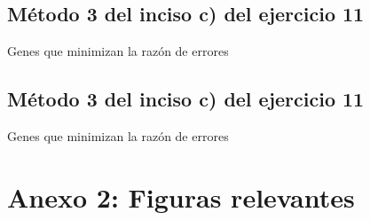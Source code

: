 \documentclass[11pt]{article}
\begin{document}
\subsection*{Método 3 del inciso c) del ejercicio 11}

\begin{table}[H]
    \centering
    \centering
    \caption{Genes que minimizan la razón de errores}
    \label{4-variance-distance}
\end{table}
\subsection*{Método 3 del inciso c) del ejercicio 11}

\begin{table}[H]
    \centering
    \centering
    \caption{Genes que minimizan la razón de errores}
    \label{4-errors-ratio}
\end{table}
\section*{Anexo 2: Figuras relevantes}
\end{document}
